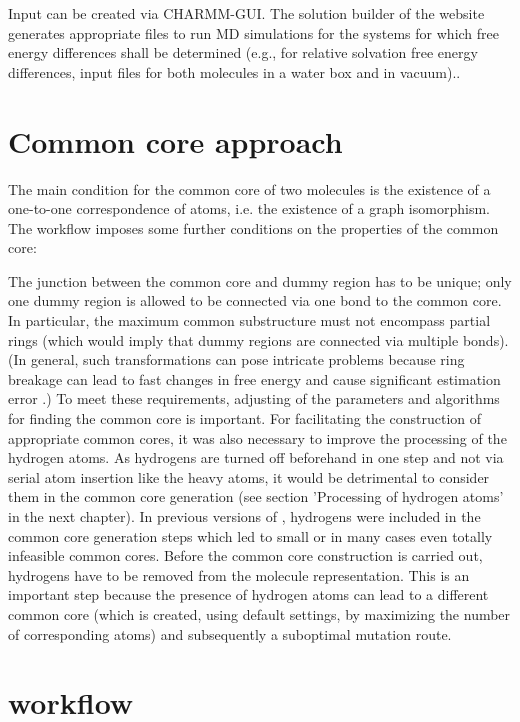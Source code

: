 Input can be created via CHARMM-GUI\cite{Jo.2008}. The solution builder of the website generates appropriate files to run MD simulations for the systems for which free energy differences shall be determined (e.g., for relative solvation free energy differences, input files for both molecules in a water box and in vacuum).\cite{Braunsfeld., Karwounopoulos.2022}.

\section{Common core approach}

The main condition for the common core of two molecules is the existence
of a one-to-one correspondence of atoms, i.e. the existence of a graph
isomorphism. The {\trafo} workflow imposes some further conditions
on the properties of the common core:

The junction between the common core and dummy region has to be unique;
only one dummy region is allowed to be connected via one bond to the
common core. In particular, the maximum common substructure must not
encompass partial rings (which would imply that dummy regions are
connected via multiple bonds). (In general, such transformations can pose intricate problems because ring breakage can lead to fast changes in free energy
and cause significant estimation error \cite{Liu.2015}.)
To meet these requirements, adjusting of the parameters and algorithms for finding the common core is important. For facilitating the construction of appropriate common cores, it was also necessary to improve the processing of the hydrogen atoms. As hydrogens are turned off beforehand in one step and not via serial atom insertion like the heavy atoms, it would be  detrimental to consider them in the common core generation (see section 'Processing of hydrogen atoms' in the next chapter). In previous versions of {\trafo}, hydrogens were included in the common core generation steps which led to small or in many cases even totally infeasible common cores. Before the common core construction is carried out, hydrogens have to be
removed from the molecule representation. This is an important step
because the presence of hydrogen atoms can lead to a different common
core (which is created, using default settings, by maximizing the
number of corresponding atoms) and subsequently a suboptimal mutation
route. 




\section{{\trafo} workflow}


